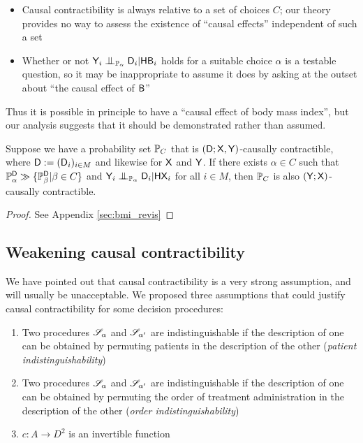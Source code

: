 \begin{itemize}
    \item Causal contractibility is always relative to a set of choices $C$; our theory provides no way to assess the existence of ``causal effects'' independent of such a set
    \item Whether or not $\RV{Y}_i\CI_{\prob{P}_\alpha} \RV{D}_i |\RV{H}\RV{B}_i$ holds for a suitable choice $\alpha$ is a testable question, so it may be inappropriate to assume it does by asking at the outset about ``the causal effect of $\mathsf{B}$''
\end{itemize}

Thus it is possible in principle to have a ``causal effect of body mass index'', but our analysis suggests that it should be demonstrated rather than assumed.

\begin{theorem}\label{lem:proxy_control}
Suppose we have a probability set $\mathbb{P}_C$ that is $(\mathsf{D};\mathsf{X},\mathsf{Y})$-causally contractible, where $\mathsf{D}:=(\mathsf{D}_i)_{i\in M}$ and likewise for $\mathsf{X}$ and $\mathsf{Y}$. If there exists $\alpha\in C$ such that $\mathbb{P}_\alpha^{\mathsf{D}}\gg \{\mathbb{P}_\beta^{\mathsf{D}}|\beta\in C\}$ and $\RV{Y}_i\CI_{\prob{P}_\alpha} \RV{D}_i|\RV{HX}_i$ for all $i\in M$, then $\mathbb{P}_C$ is also $(\mathsf{Y};\mathsf{X})$-causally contractible.
\end{theorem}

\begin{proof}
See Appendix \ref{sec:bmi_revis}
\end{proof}

\subsection{Weakening causal contractibility}

We have pointed out that causal contractibility is a very strong assumption, and will usually be unacceptable. We proposed three assumptions that could justify causal contractibility for some decision procedures:

\begin{enumerate}
    \item Two procedures $\mathscr{S}_\alpha$ and $\mathscr{S}_{\alpha'}$ are indistinguishable if the description of one can be obtained by permuting patients in the description of the other (\emph{patient indistinguishability})
    \item Two procedures $\mathscr{S}_\alpha$ and $\mathscr{S}_{\alpha'}$ are indistinguishable if the description of one can be obtained by permuting the order of treatment administration in the description of the other (\emph{order indistinguishability})
    \item $c:A\to D^2$ is an invertible function
\end{enumerate}

